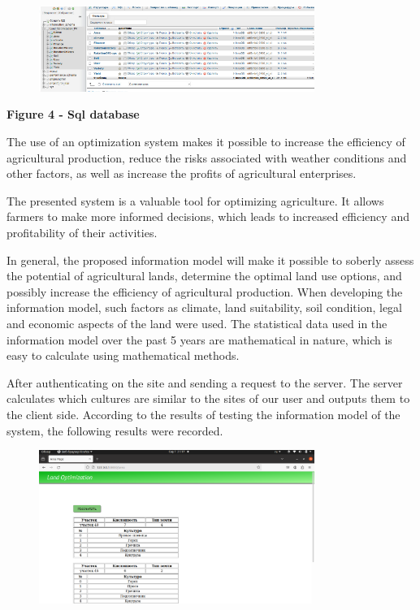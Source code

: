 \begin{figure}[H]
	\centering
	\includegraphics[width=0.8\textwidth]{assets/71}
	\caption*{}
\end{figure}

{\bfseries Figure 4 - Sql database}

The use of an optimization system makes it possible to increase the
efficiency of agricultural production, reduce the risks associated with
weather conditions and other factors, as well as increase the profits of
agricultural enterprises.

The presented system is a valuable tool for optimizing agriculture. It
allows farmers to make more informed decisions, which leads to increased
efficiency and profitability of their activities.

In general, the proposed information model will make it possible to
soberly assess the potential of agricultural lands, determine the
optimal land use options, and possibly increase the efficiency of
agricultural production. When developing the information model, such
factors as climate, land suitability, soil condition, legal and economic
aspects of the land were used. The statistical data used in the
information model over the past 5 years are mathematical in nature,
which is easy to calculate using mathematical methods.

After authenticating on the site and sending a request to the server.
The server calculates which cultures are similar to the sites of our
user and outputs them to the client side. According to the results of
testing the information model of the system, the following results were
recorded.

\begin{figure}[H]
	\centering
	\includegraphics[width=0.8\textwidth]{assets/72}
	\caption*{}
\end{figure}

